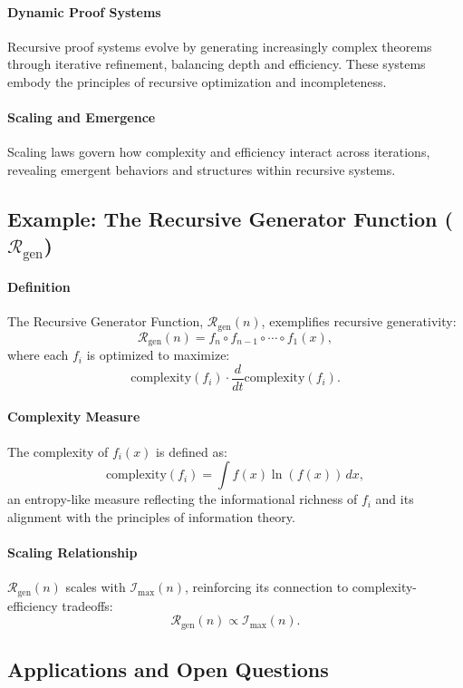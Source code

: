 \documentclass[12pt]{article}
\begin{document}
\paragraph{Dynamic Proof Systems}
Recursive proof systems evolve by generating increasingly complex theorems through iterative refinement, balancing depth and efficiency. These systems embody the principles of recursive optimization and incompleteness.

\paragraph{Scaling and Emergence}
Scaling laws govern how complexity and efficiency interact across iterations, revealing emergent behaviors and structures within recursive systems.


\subsection{Example: The Recursive Generator Function (\(\mathcal{R}_{\text{gen}}\))}

\paragraph{Definition}
The Recursive Generator Function, \(\mathcal{R}_{\text{gen}}(n)\), exemplifies recursive generativity:
\[
\mathcal{R}_{\text{gen}}(n) = f_n \circ f_{n-1} \circ \cdots \circ f_1(x),
\]
where each \(f_i\) is optimized to maximize:
\[
\text{complexity}(f_i) \cdot \frac{d}{dt} \text{complexity}(f_i).
\]

\paragraph{Complexity Measure}
The complexity of \(f_i(x)\) is defined as:
\[
\text{complexity}(f_i) = \int f(x) \ln(f(x)) \, dx,
\]
an entropy-like measure reflecting the informational richness of \(f_i\) and its alignment with the principles of information theory.

\paragraph{Scaling Relationship}
\(\mathcal{R}_{\text{gen}}(n)\) scales with \(\mathcal{I}_{\text{max}}(n)\), reinforcing its connection to complexity-efficiency tradeoffs:
\[
\mathcal{R}_{\text{gen}}(n) \propto \mathcal{I}_{\text{max}}(n).
\]


\subsection{Applications and Open Questions}
\end{document}
